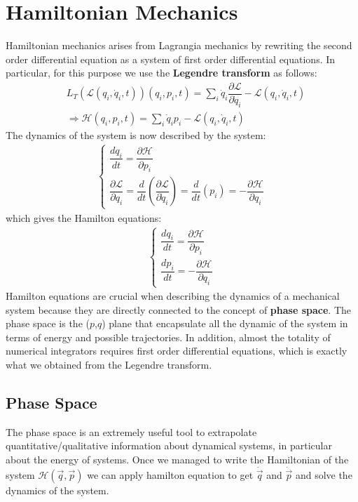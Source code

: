 \documentclass[12pt,a4paper]{article}
\begin{document}
\section{Hamiltonian Mechanics}
Hamiltonian mechanics arises from Lagrangia mechanics by rewriting the second order differential equation as a system of first order differential equations.
In particular, for this purpose we use the \textbf{Legendre transform} as follows:
\begin{align*}
	&L_T(\mathcal{L}(q_i,\dot{q}_i,t))(q_i,p_i,t) = \sum_{i}\dot{q}_i \dfrac{\partial \mathcal{L}}{\partial \dot{q}_i} - \mathcal{L}(q_i, \dot{q}_i, t)\\[5pt]
	&\Rightarrow \mathcal{H}(q_i,p_i,t) = \sum_{i} \dot{q}_i p_i - \mathcal{L}(q_i,\dot{q}_i,t)
\end{align*}
The dynamics of the system is now described by the system:
\begin{align*}
	\begin{cases}
		\dfrac{dq_i}{dt} = \dfrac{\partial \mathcal{H}}{\partial p_i}\\[12pt]
		\dfrac{\partial \mathcal{L}}{\partial q_i} = \dfrac{d}{dt}\left( \dfrac{\partial \mathcal{L}}{\partial \dot{q}_i} \right) = \dfrac{d}{dt}(p_i) = -\dfrac{\partial \mathcal{H}}{\partial q_i}
	\end{cases}
\end{align*}
which gives the Hamilton equations:
\begin{align*}
	\begin{cases}
		\dfrac{dq_i}{dt} = \dfrac{\partial \mathcal{H}}{\partial p_i}\\[12pt]
		\dfrac{dp_i}{dt} = -\dfrac{\partial \mathcal{H}}{\partial q_i}
	\end{cases}
\end{align*}
Hamilton equations are crucial when describing the dynamics of a mechanical system because they are directly connected to the concept of \textbf{phase space}. The phase space is the ($p$,$q$) plane that encapsulate all the dynamic of the system in terms of energy and possible trajectories.
In addition, almost the totality of numerical integrators requires first order differential equations, which is exactly what we obtained from the Legendre transform.

\subsection{Phase Space}
The phase space is an extremely useful tool to extrapolate quantitative/qualitative information about dynamical systems, in particular about the energy of systems.
Once we managed to write the Hamiltonian of the system $\mathcal{H}(\vec{q}, \vec{p})$ we can apply hamilton equation to get $\dot{\vec{q}}$ and $\dot{\vec{p}}$ and solve the dynamics of the system.
\end{document}

